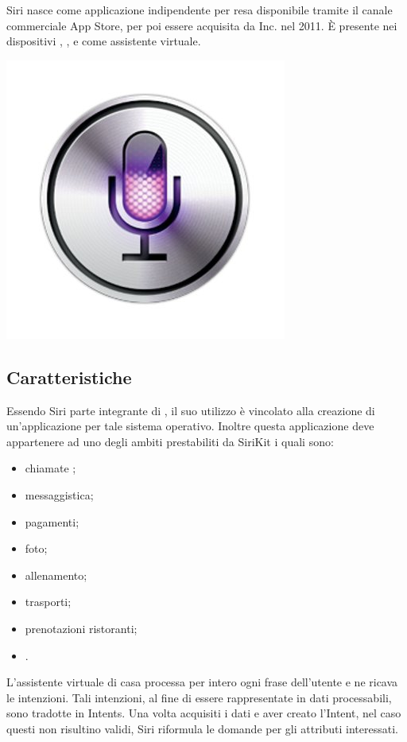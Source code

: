 \documentclass[a4paper,titlepage]{article}
\begin{document}
	\begin{minipage}{0.7\textwidth}\raggedright
		Siri nasce come applicazione indipendente per  resa disponibile tramite il canale commerciale App Store, per poi essere acquisita da  Inc. nel 2011. È presente nei dispositivi , ,  e  come assistente virtuale.
	\end{minipage}
	\hfill
	\noindent\begin{minipage}{0.1\textwidth}
		\includegraphics[scale=0.3]{images/siri.jpg}
	\end{minipage}
	\subsection{Caratteristiche}
		Essendo Siri parte integrante di , il suo utilizzo è vincolato alla creazione di un'applicazione per tale sistema operativo. Inoltre questa applicazione deve appartenere ad uno degli ambiti prestabiliti da SiriKit i quali sono:
			\begin{itemize}
				\item chiamate ;
				\item messaggistica;
				\item pagamenti;
				\item foto;
				\item allenamento;
				\item trasporti;
				\item prenotazioni ristoranti;
				\item {}.
			\end{itemize}
		L'assistente virtuale di casa  processa per intero ogni frase dell'utente e ne ricava le intenzioni. Tali intenzioni, al fine di essere rappresentate in dati processabili, sono tradotte in Intents. Una volta acquisiti i dati e aver creato l'Intent, nel caso questi non risultino validi, Siri riformula le domande per gli attributi interessati.
\newpage
\end{document}

